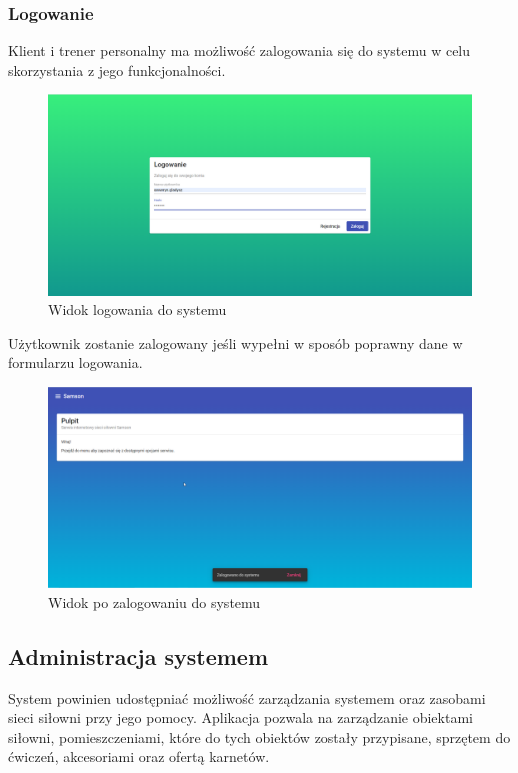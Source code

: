 \documentclass[a4paper,twoside,12pt]{book}
\begin{document}
\subsubsection{Logowanie}
Klient i trener personalny ma możliwość zalogowania się do systemu w celu skorzystania z jego funkcjonalności.
\begin{figure}[H]
	\centering
	\includegraphics[width=1\linewidth]{../zrzuty_ekranu/dzialanie/rejestracja_logowanie/logowanie}
	\caption{Widok logowania do systemu}
	\label{fig:logowanie}
\end{figure}
Użytkownik zostanie zalogowany jeśli wypełni w sposób poprawny dane w formularzu logowania.
\begin{figure}[H]
	\centering
	\includegraphics[width=1\linewidth]{../zrzuty_ekranu/dzialanie/rejestracja_logowanie/zalogowano}
	\caption{Widok po zalogowaniu do systemu}
	\label{fig:zalogowano}
\end{figure}

\subsection{Administracja systemem}
System powinien udostępniać możliwość zarządzania systemem oraz zasobami sieci siłowni przy jego pomocy. Aplikacja pozwala na zarządzanie obiektami siłowni, pomieszczeniami, które do tych obiektów zostały przypisane, sprzętem do ćwiczeń, akcesoriami oraz ofertą karnetów.
\end{document}
